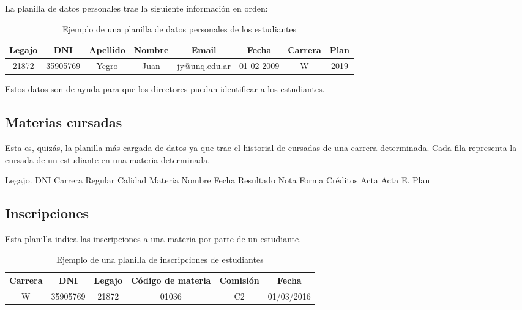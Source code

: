 La planilla de datos personales trae la siguiente información en orden: 

\begin{table}[!htbp]
    \centering
    \begin{tabular}{|c|c|c|c|c|c|c|c|}
    \hline
    Legajo & DNI & Apellido & Nombre & Email & Fecha & Carrera & Plan \\ \hline
    21872 & 35905769 & Yegro & Juan & jy@unq.edu.ar & 01-02-2009 & W & 2019 \\
    \hline
    \end{tabular}
    \caption{Ejemplo de una planilla de datos personales de los estudiantes}
    \label{tab:tabla_datos}
\end{table}

Estos datos son de ayuda para que los directores puedan identificar a los estudiantes.

\subsection[Materias cursadas]{Materias cursadas}

Esta es, quizás, la planilla más cargada de datos ya que trae el historial de cursadas de una carrera determinada. Cada fila representa la cursada de un estudiante en una materia determinada.


\begin{outline}
    \2 Legajo.
    \2 DNI 
    \2 Carrera 
    \2 Regular 
    \2 Calidad 
    \2 Materia 
    \2 Nombre 
    \2 Fecha 
    \2 Resultado 
    \2 Nota 
    \2 Forma 
    \2 Créditos
    \2 Acta 
    \2 Acta E. 
    \2 Plan
\end{outline}

\subsection[Inscripciones]{Inscripciones}

Esta planilla indica las inscripciones a una materia por parte de un estudiante.

\begin{table}[!htbp]
    \centering
    \makegapedcells
    \begin{tabular}{|c|c|c|c|c|c|}
    \hline
    Carrera & DNI & Legajo & Código de materia & Comisión & Fecha  \\\hline
    W & 35905769 & 21872 & 01036 & C2 & 01/03/2016  \\
    \hline
    \end{tabular}
    \caption{Ejemplo de una planilla de inscripciones de estudiantes}
    \label{tab:tabla_datos}
\end{table}


